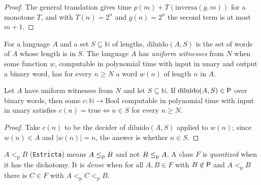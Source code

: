 \begin{proof}
  \leanok
  The general translation gives time $p(m) + T(\mathrm{inversa}(g, m))$ for a monotone $T$, and with $T(n) =
  2^n$ and $g(n) = 2^n$ the second term is at most $m + 1$.
\end{proof}

\begin{definition}
  \label{def:structure-diluido}
  \leanok
  For a language $A$ and a set $S \subseteq \mathbb{N}$ of lengths, $\mathrm{diluido}(A, S)$ is the set of
  words of $A$ whose length is in $S$. The language $A$ has \emph{uniform witnesses} from $N$ when
  some function $w$, computable in polynomial time with input in unary and output a binary word, has
  for every $n \ge N$ a word $w(n)$ of length $n$ in $A$.
  \own{}
\end{definition}

\begin{theorem}
  \label{thm:structure-reloj-diluido}
  \leanok
  Let $A$ have uniform witnesses from $N$ and let $S \subseteq \mathbb{N}$. If $\mathrm{diluido}(A, S)
  \in \mathsf{P}$ over binary words, then some $c : \mathbb{N} \to \mathrm{Bool}$ computable in polynomial time
  with input in unary satisfies $c(n) = \mathrm{true} \iff n \in S$ for every $n \ge N$.
  \own{}
\end{theorem}

\begin{proof}
  \leanok
  Take $c(n)$ to be the decider of $\mathrm{diluido}(A, S)$ applied to $w(n)$; since $w(n) \in A$ and
  $|w(n)| = n$, the answer is whether $n \in S$.
\end{proof}

\begin{definition}
  \label{def:structure-denso}
  \leanok
  $A <_{\mathrm{p}} B$ (\texttt{Estricta}) means $A \le_{\mathrm{p}} B$ and not $B \le_{\mathrm{p}} A$. A class $F$ is
  \emph{quantized} when it has the dichotomy. It is \emph{dense} when for all $A, B \in F$ with $B
  \notin \mathsf{P}$ and $A <_{\mathrm{p}} B$ there is $C \in F$ with $A <_{\mathrm{p}} C <_{\mathrm{p}} B$.
  \own{}
\end{definition}

